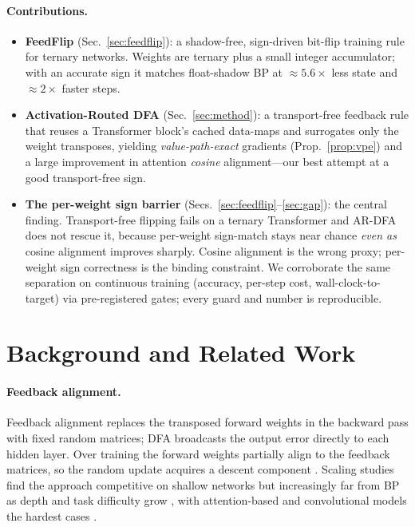 \documentclass[11pt]{article}
\newcommand{\ARDFA}{\textsc{AR-DFA}}
\begin{document}
\paragraph{Contributions.}
\begin{itemize}[leftmargin=*]
  \item \textbf{FeedFlip} (Sec.~\ref{sec:feedflip}): a shadow-free, sign-driven bit-flip training rule for ternary networks. Weights are ternary plus a small integer accumulator; with an accurate sign it matches float-shadow BP at $\approx\!5.6\times$ less state and $\approx\!2\times$ faster steps.
  \item \textbf{Activation-Routed DFA} (Sec.~\ref{sec:method}): a transport-free feedback rule that reuses a Transformer block's cached data-maps and surrogates only the weight transposes, yielding \emph{value-path-exact} gradients (Prop.~\ref{prop:vpe}) and a large improvement in attention \emph{cosine} alignment---our best attempt at a good transport-free sign.
  \item \textbf{The per-weight sign barrier} (Secs.~\ref{sec:feedflip}--\ref{sec:gap}): the central finding. Transport-free flipping fails on a ternary Transformer and \ARDFA{} does not rescue it, because per-weight sign-match stays near chance \emph{even as} cosine alignment improves sharply. Cosine alignment is the wrong proxy; per-weight sign correctness is the binding constraint. We corroborate the same separation on continuous training (accuracy, per-step cost, wall-clock-to-target) via pre-registered gates; every guard and number is reproducible.
\end{itemize}

\section{Background and Related Work}\label{sec:related}
\paragraph{Feedback alignment.} Feedback alignment \citep{lillicrap2016random} replaces the transposed forward weights in the backward pass with fixed random matrices; DFA \citep{nokland2016direct} broadcasts the output error directly to each hidden layer. Over training the forward weights partially align to the feedback matrices, so the random update acquires a descent component \citep{refinetti2021align}. Scaling studies find the approach competitive on shallow networks but increasingly far from BP as depth and task difficulty grow \citep{bartunov2018assessing}, with attention-based and convolutional models the hardest cases \citep{launay2020direct}.
\end{document}
